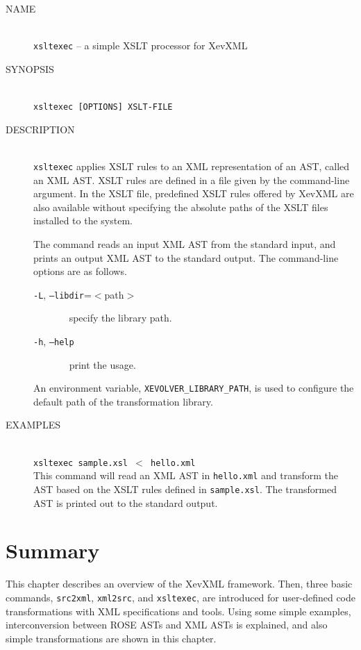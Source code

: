 \begin{framed}
\begin{description}
 \item[NAME]~\\
	    \texttt{xsltexec} -- a simple XSLT processor for XevXML

 \item[SYNOPSIS]~\\
	    \texttt{xsltexec [OPTIONS] XSLT-FILE}

 \item[DESCRIPTION]~\\ \texttt{xsltexec} applies XSLT rules to an XML
	    representation of an AST, called an XML AST. XSLT rules are
	    defined in a file given by the command-line argument. In the
	    XSLT file, predefined XSLT rules offered by XevXML are also
	    available without specifying the absolute paths of the XSLT
	    files installed to the system.

	    The command reads an input XML AST from the standard input,
	    and prints an output XML AST to the standard output. The
	    command-line options are as follows.

	    \begin{description}
	    \item[\texttt{-L}, \texttt{--libdir}=$<$path$>$]~\newline
	    specify the library path.      
    	    \item[\texttt{-h}, \texttt{--help}]~\newline
	    print the usage.
	    \end{description}

	    An environment variable, \texttt{XEVOLVER\_LIBRARY\_PATH},
	    is used to configure the default path of the transformation
	    library.
 \item[EXAMPLES]~\\ \texttt{xsltexec sample.xsl $<$ hello.xml}\\ This
	    command will read an XML AST in \texttt{hello.xml} and
	    transform the AST based on the XSLT rules defined in
	    \texttt{sample.xsl}. The transformed AST is printed out to
	    the standard output.
\end{description}
\end{framed}



\section{Summary}
This chapter describes an overview of the XevXML framework. Then, three
basic commands, \texttt{src2xml}, \texttt{xml2src}, and
\texttt{xsltexec}, are introduced for user-defined code transformations
with XML specifications and tools. Using some simple examples,
interconversion between ROSE ASTs and XML ASTs is explained, and also
simple transformations are shown in this chapter.

